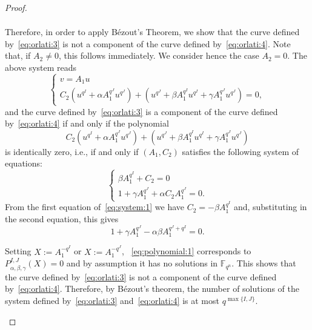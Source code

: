 \begin{proof}
\begin{enumerate}
\begin{equation*}
\begin{split}
\end{split}
\end{equation*}
Therefore, in order to apply Bézout's Theorem, we show that the curve defined by~\eqref{eq:orlati:3} is not a component of the curve defined by~\eqref{eq:orlati:4}. Note that, if $A_2\neq 0$, this follows immediately. We consider hence the case $A_2=0$. The above system reads 
\begin{equation*}
    \begin{cases}
    v = A_1 u \\
    C_2 \left(u^{q^I} + \alpha A_1^{q^J}u^{q^J}\right) + \left(u^{q^J} + \beta A_1^{q^I}u^{q^I} + \gamma A_1^{q^J}u^{q^J}\right) = 0,
    \end{cases}
\end{equation*}
and the curve defined by~\eqref{eq:orlati:3} is a component of the curve defined by~\eqref{eq:orlati:4} if and only if the polynomial
\begin{equation*}
    C_2 \left(u^{q^I} + \alpha A_1^{q^J}u^{q^J}\right) + \left(u^{q^J} + \beta A_1^{q^I}u^{q^I} + \gamma A_1^{q^J}u^{q^J}\right)
\end{equation*}
is identically zero, i.e., if and only if $(A_1,C_2)$ satisfies the following system of equations:
\begin{equation}
\label{eq:system:1}
    \begin{cases}
    \beta A_1^{q^I} + C_2 = 0 \\
    1 + \gamma A_1^{q^J} + \alpha C_2 A_1^{q^J} = 0.
    \end{cases}
\end{equation}
From the first equation of~\eqref{eq:system:1} we  have $C_2 = -\beta A_1^{q^I}$ and, substituting in the second equation, this gives
\begin{equation}
    \label{eq:polynomial:1}
    1 + \gamma A_1^{q^J} - \alpha\beta A_1^{q^J + q^I} = 0.
\end{equation}

Setting $X:= A_1^{-q^{I}}$ or $X:= A_1^{-q^{J}}$, ~\eqref{eq:polynomial:1} corresponds to  $P^{I,J}_{\alpha,\beta,\gamma}(X)=0$ and by assumption it  has no solutions in $\mathbb{F}_{q^n}$. This  shows that the curve defined by~\eqref{eq:orlati:3} is not a component of the curve defined by~\eqref{eq:orlati:4}.  Therefore, by B\'ezout's theorem, the number of solutions of the system defined by~\eqref{eq:orlati:3} and~\eqref{eq:orlati:4} is at most $q^{\max\{I,J\}}$.


\end{enumerate}
\end{proof}
